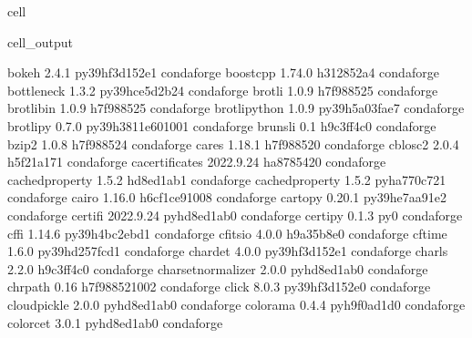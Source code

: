 \documentclass[letterpaper,table,10pt,english]{jupyterBook}
\begin{document}
\begin{sphinxuseclass}{cell}
\begin{sphinxVerbatimOutput}
\begin{sphinxuseclass}{cell_output}
\begin{sphinxVerbatim}[commandchars=\\\{\}]
bokeh                     2.4.1            py39hf3d152e\PYGZus{}1    conda\PYGZhy{}forge
boost\PYGZhy{}cpp                 1.74.0               h312852a\PYGZus{}4    conda\PYGZhy{}forge
bottleneck                1.3.2            py39hce5d2b2\PYGZus{}4    conda\PYGZhy{}forge
brotli                    1.0.9                h7f98852\PYGZus{}5    conda\PYGZhy{}forge
brotli\PYGZhy{}bin                1.0.9                h7f98852\PYGZus{}5    conda\PYGZhy{}forge
brotli\PYGZhy{}python             1.0.9            py39h5a03fae\PYGZus{}7    conda\PYGZhy{}forge
brotlipy                  0.7.0           py39h3811e60\PYGZus{}1001    conda\PYGZhy{}forge
brunsli                   0.1                  h9c3ff4c\PYGZus{}0    conda\PYGZhy{}forge
bzip2                     1.0.8                h7f98852\PYGZus{}4    conda\PYGZhy{}forge
c\PYGZhy{}ares                    1.18.1               h7f98852\PYGZus{}0    conda\PYGZhy{}forge
c\PYGZhy{}blosc2                  2.0.4                h5f21a17\PYGZus{}1    conda\PYGZhy{}forge
ca\PYGZhy{}certificates           2022.9.24            ha878542\PYGZus{}0    conda\PYGZhy{}forge
cached\PYGZhy{}property           1.5.2                hd8ed1ab\PYGZus{}1    conda\PYGZhy{}forge
cached\PYGZus{}property           1.5.2              pyha770c72\PYGZus{}1    conda\PYGZhy{}forge
cairo                     1.16.0            h6cf1ce9\PYGZus{}1008    conda\PYGZhy{}forge
cartopy                   0.20.1           py39he7aa91e\PYGZus{}2    conda\PYGZhy{}forge
certifi                   2022.9.24          pyhd8ed1ab\PYGZus{}0    conda\PYGZhy{}forge
certipy                   0.1.3                      py\PYGZus{}0    conda\PYGZhy{}forge
cffi                      1.14.6           py39h4bc2ebd\PYGZus{}1    conda\PYGZhy{}forge
cfitsio                   4.0.0                h9a35b8e\PYGZus{}0    conda\PYGZhy{}forge
cftime                    1.6.0            py39hd257fcd\PYGZus{}1    conda\PYGZhy{}forge
chardet                   4.0.0            py39hf3d152e\PYGZus{}1    conda\PYGZhy{}forge
charls                    2.2.0                h9c3ff4c\PYGZus{}0    conda\PYGZhy{}forge
charset\PYGZhy{}normalizer        2.0.0              pyhd8ed1ab\PYGZus{}0    conda\PYGZhy{}forge
chrpath                   0.16              h7f98852\PYGZus{}1002    conda\PYGZhy{}forge
click                     8.0.3            py39hf3d152e\PYGZus{}0    conda\PYGZhy{}forge
cloudpickle               2.0.0              pyhd8ed1ab\PYGZus{}0    conda\PYGZhy{}forge
colorama                  0.4.4              pyh9f0ad1d\PYGZus{}0    conda\PYGZhy{}forge
colorcet                  3.0.1              pyhd8ed1ab\PYGZus{}0    conda\PYGZhy{}forge

\end{sphinxVerbatim}
\end{sphinxuseclass}
\end{sphinxVerbatimOutput}
\end{sphinxuseclass}
\end{document}
